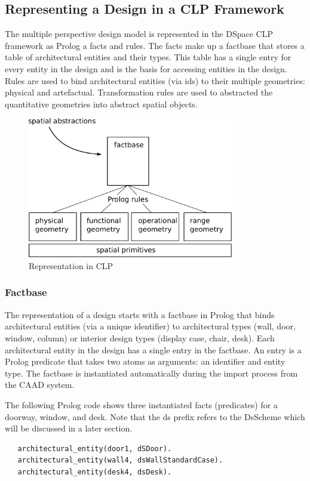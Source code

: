 \documentclass[12pt]{ucthesis}
\begin{document}
 \subsection{Representing a Design in a CLP Framework}
The multiple perspective design model is represented in the DSpace CLP framework as Prolog a facts and rules. The facts make up a factbase that stores a table of architectural entities and their types. This table has a single entry for every entity in the design and is the basis for accessing entities in the design. Rules are used to bind architectural entities (via ids) to their multiple geometries: physical and artefactual. Transformation rules are used to abstracted the quantitative geometries into abstract spatial objects. 

\begin{figure}[H]
\centering
\includegraphics[width=90mm]{clp-design}
\caption{Representation in CLP}
\label{clp-design}
\end{figure}

\subsubsection{Factbase}
The representation of a design starts with a factbase in Prolog that binds architectural entities (via a unique identifier) to architectural types (wall, door, window, column) or interior design types (display case, chair, desk). Each architectural entity in the design has a single entry in the factbase. An entry is a Prolog predicate that takes two atoms as arguments: an identifier and entity type. The factbase is instantiated automatically during the import process from the CAAD system. 

The following Prolog code shows three instantiated facts (predicates) for a doorway, window, and desk. Note that the ds prefix refers to the DsScheme which will be discussed in a later section.  
\begin{verbatim}
   architectural_entity(door1, dSDoor).
   architectural_entity(wall4, dsWallStandardCase).
   architectural_entity(desk4, dsDesk).
\end{verbatim}
\end{document}
